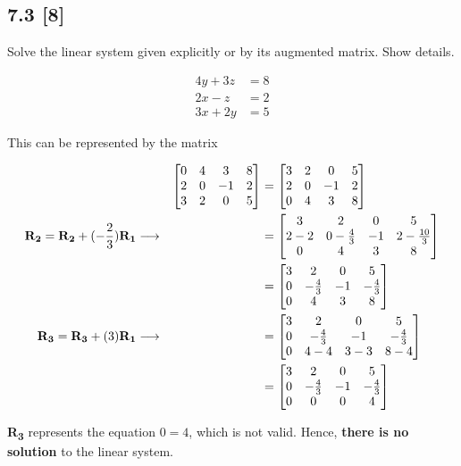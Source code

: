 \documentclass{article}
\begin{document}
\subsection*{7.3 [8]}
\setcounter{equation}{0}

Solve the linear system given explicitly or by its augmented matrix. Show details.

\begin{align}
    \label{eq:1}
    4y + 3z &= 8\\
    \label{eq:2}
    2x - z &= 2\\
    \label{eq:3}
    3x + 2y &= 5
\end{align}

This can be represented by the matrix

\begin{align}
    \label{eq:4}
    && \begin{bmatrix}
    0 & 4 & 3 & 8\\
    2 & 0 & -1 & 2\\
    3 & 2 & 0 & 5
    \end{bmatrix} &= \begin{bmatrix}
    3 & 2 & 0 & 5\\
    2 & 0 & -1 & 2\\
    0 & 4 & 3 & 8
    \end{bmatrix}
    \\
    \label{eq:5}
    \textbf{R\textsubscript{2}} = \textbf{R\textsubscript{2}} + (-\frac{2}{3})\textbf{R\textsubscript{1}} \longrightarrow && &= \begin{bmatrix}
    3 & 2 & 0 & 5\\
    2-2 & 0-\frac{4}{3} & -1 & 2-\frac{10}{3}\\
    0 & 4 & 3 & 8
    \end{bmatrix}
    \\
    \label{eq:6}
    && &= \begin{bmatrix}
    3 & 2 & 0 & 5\\
    0 & -\frac{4}{3} & -1 & -\frac{4}{3}\\
    0 & 4 & 3 & 8
    \end{bmatrix}
    \\
    \label{eq:7}
    \textbf{R\textsubscript{3}} = \textbf{R\textsubscript{3}} + (3)\textbf{R\textsubscript{1}} \longrightarrow && &= \begin{bmatrix}
    3 & 2 & 0 & 5\\
    0 & -\frac{4}{3} & -1 & -\frac{4}{3}\\
    0 & 4-4 & 3-3 & 8-4
    \end{bmatrix}
    \\
    \label{eq:8}
    && &= \begin{bmatrix}
    3 & 2 & 0 & 5\\
    0 & -\frac{4}{3} & -1 & -\frac{4}{3}\\
    0 & 0 & 0 & 4
    \end{bmatrix}
\end{align}

\textbf{R\textsubscript{3}} represents the equation $0=4$, which is not valid.  Hence, \textbf{there is no solution} to the linear system.
\end{document}
